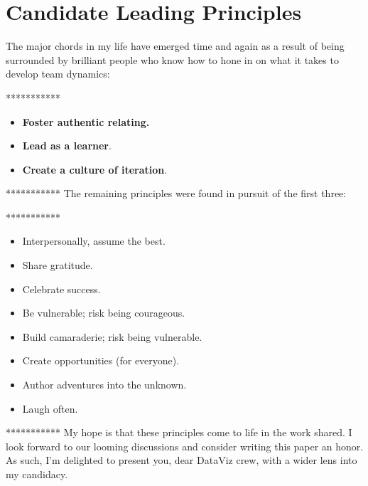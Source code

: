 \documentclass[11pt]{article}
\begin{document}
\section{Candidate Leading Principles}\label{sec:lead}
The major chords in my life have emerged time and again as a result of being surrounded by brilliant people who know how to hone in on what it takes to develop team dynamics: \newline

 ***********
\begin{itemize}
	\item \textbf{Foster authentic relating.} 
	\item \textbf{Lead as a learner}.
         \item \textbf{Create a culture of iteration}.
\end{itemize}
 
 ***********\newline
The remaining principles were found in pursuit of the first three: \newline

 	***********\
\begin{itemize}
         \item Interpersonally, assume the best.
         \item Share gratitude.
         \item Celebrate success.
         \item Be vulnerable; risk being courageous.
         \item Build camaraderie; risk being vulnerable.
         \item Create opportunities (for everyone).  
         \item Author adventures into the unknown. 
         \item Laugh often.
\end{itemize}

 ***********\newline
My hope is that these principles come to life in the work shared. I look forward to our looming discussions and consider writing this paper an honor. As such, I'm delighted to present you, dear DataViz crew, with a wider lens into my candidacy.

 
\end{document}
